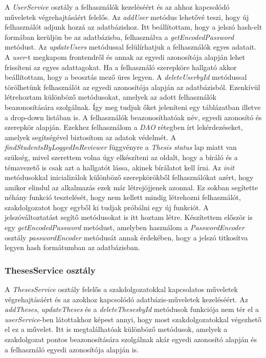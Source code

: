 A \textit{UserService} osztály a felhasználók kezeléséért és az ahhoz kapcsolódó műveletek végrehajtásáért felelős. Az \textit{addUser} metódus lehetővé teszi, hogy új felhasználót adjunk hozzá az adatbázishoz. Itt beállítottam, hogy a jelszó hash-elt formában kerüljön be az adatbázisba, felhasználva a \textit{getEncodedPassword} metódust. Az \textit{updateUsers} metódussal felülírhatjuk a felhasználók egyes adatait. A \textit{user}-t megkapom frontendről és annak az egyedi azonosítója alapján lehet frissíteni az egyes adattagokat. Ha a felhasználó szerepköre hallgató akkor beállítottam, hogy a beosztás mező üres legyen. A \textit{deleteUserbyId} metódussal törölhetünk felhasználót az egyedi azonosítója alapján az adatbázisból. Ezenkívül létrehoztam különböző metódusokat, amelyek az adott felhasználók beazonosítására szolgálnak. Így meg tudjuk őket jeleníteni egy táblázatban illetve a drop-down listában is. A felhasználók beazonosíthatóak név, egyedi azonosító és szerepkör alapján.
Ezekhez felhasználom a \textit{DAO} \cite{DAO} rétegben írt lekérdezéseket, amelyek segítségével biztosítom az adatok védelmét. A \textit{findStudentsByLoggedInReviewer} függvényre a \textit{Thesis status} lap miatt van szükség, mivel szerettem volna úgy elkészíteni az oldalt, hogy a bíráló és a témavezető is csak azt a hallgatót lássa, akinek bírálatot kell írni. Az \textit{init} metódusokkal inicializálok különböző szerepkörökből felhasználókat azért, hogy amikor elindul az alkalmazás ezek már létrejöjjenek azonnal. Ez sokban segítette néhány funkció tesztelését, hogy nem kellett mindig létrehozni felhasználót, szakdolgozatot hogy egyből ki tudjak próbálni egy új funkciót. A jelszóváltoztatást segítő metódusokat is itt hoztam létre. Készítettem először is egy \textit{getEncodedPassword} metódust, amelyben használom a \textit{PasswordEncoder} osztály \textit{passwordEncoder} metódusát annak érdekében, hogy a jelszó titkosítva legyen hash formátumban az adatbázisban.

\subsubsection{ThesesService osztály}

A \textit{ThesesService} osztály felelős a szakdolgozatokkal kapcsolatos műveletek végrehajtásáért és az azokhoz kapcsolódó adatbázis-műveletek kezeléséért. Az \textit{addTheses}, \textit{updateTheses} és a \textit{deleteThesesbyId} metódusok funkciója nem tér el a \textit{userService}-ben látottakhoz képest annyi, hogy most szakdolgozatokkal végezhető el ez a művelet. Itt is megtalálhatóak különböző metódusok, amelyek a szakdolgozat pontos beazonosítására szolgálnak akár egyedi azonosító alapján és a felhasználó egyedi azonosítója alapján is.

